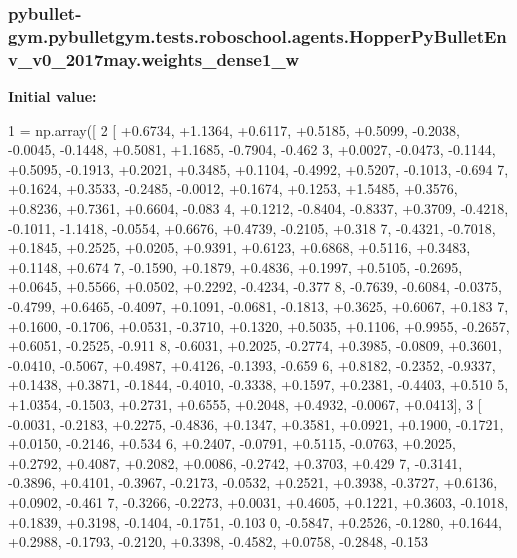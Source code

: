 \subsubsection[{\texorpdfstring{weights\+\_\+dense1\+\_\+w}{weights_dense1_w}}]{\setlength{\rightskip}{0pt plus 5cm}pybullet-\/gym.\+pybulletgym.\+tests.\+roboschool.\+agents.\+Hopper\+Py\+Bullet\+Env\+\_\+v0\+\_\+2017may.\+weights\+\_\+dense1\+\_\+w}\hypertarget{namespacepybullet-gym_1_1pybulletgym_1_1tests_1_1roboschool_1_1agents_1_1_hopper_py_bullet_env__v0__2017may_adb59ece4e7e67acdfa990f5ff051ed34}{}\label{namespacepybullet-gym_1_1pybulletgym_1_1tests_1_1roboschool_1_1agents_1_1_hopper_py_bullet_env__v0__2017may_adb59ece4e7e67acdfa990f5ff051ed34}
{\bfseries Initial value\+:}
\begin{DoxyCode}
1 = np.array([
2 [ +0.6734, +1.1364, +0.6117, +0.5185, +0.5099, -0.2038, -0.0045, -0.1448, +0.5081, +1.1685, -0.7904, -0.462
      3, +0.0027, -0.0473, -0.1144, +0.5095, -0.1913, +0.2021, +0.3485, +0.1104, -0.4992, +0.5207, -0.1013, -0.694
      7, +0.1624, +0.3533, -0.2485, -0.0012, +0.1674, +0.1253, +1.5485, +0.3576, +0.8236, +0.7361, +0.6604, -0.083
      4, +0.1212, -0.8404, -0.8337, +0.3709, -0.4218, -0.1011, -1.1418, -0.0554, +0.6676, +0.4739, -0.2105, +0.318
      7, -0.4321, -0.7018, +0.1845, +0.2525, +0.0205, +0.9391, +0.6123, +0.6868, +0.5116, +0.3483, +0.1148, +0.674
      7, -0.1590, +0.1879, +0.4836, +0.1997, +0.5105, -0.2695, +0.0645, +0.5566, +0.0502, +0.2292, -0.4234, -0.377
      8, -0.7639, -0.6084, -0.0375, -0.4799, +0.6465, -0.4097, +0.1091, -0.0681, -0.1813, +0.3625, +0.6067, +0.183
      7, +0.1600, -0.1706, +0.0531, -0.3710, +0.1320, +0.5035, +0.1106, +0.9955, -0.2657, +0.6051, -0.2525, -0.911
      8, -0.6031, +0.2025, -0.2774, +0.3985, -0.0809, +0.3601, -0.0410, -0.5067, +0.4987, +0.4126, -0.1393, -0.659
      6, +0.8182, -0.2352, -0.9337, +0.1438, +0.3871, -0.1844, -0.4010, -0.3338, +0.1597, +0.2381, -0.4403, +0.510
      5, +1.0354, -0.1503, +0.2731, +0.6555, +0.2048, +0.4932, -0.0067, +0.0413],
3 [ -0.0031, -0.2183, +0.2275, -0.4836, +0.1347, +0.3581, +0.0921, +0.1900, -0.1721, +0.0150, -0.2146, +0.534
      6, +0.2407, -0.0791, +0.5115, -0.0763, +0.2025, +0.2792, +0.4087, +0.2082, +0.0086, -0.2742, +0.3703, +0.429
      7, -0.3141, -0.3896, +0.4101, -0.3967, -0.2173, -0.0532, +0.2521, +0.3938, -0.3727, +0.6136, +0.0902, -0.461
      7, -0.3266, -0.2273, +0.0031, +0.4605, +0.1221, +0.3603, -0.1018, +0.1839, +0.3198, -0.1404, -0.1751, -0.103
      0, -0.5847, +0.2526, -0.1280, +0.1644, +0.2988, -0.1793, -0.2120, +0.3398, -0.4582, +0.0758, -0.2848, -0.153

\end{DoxyCode}
